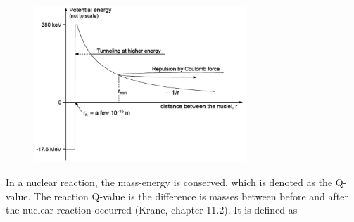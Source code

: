 \documentclass[a4paper,11pt,twoside]{book}
\begin{document}



\begin{figure}
    \centering
    \includegraphics[width=8cm]{Theory/Coulomb_barr.png}
    \caption{ }
    \label{fig:Coulomb_barrier}
\end{figure}

\noindent In a nuclear reaction, the mass-energy is conserved, which is denoted as the Q-value. The reaction Q-value is the difference is masses between before and after the nuclear reaction occurred (Krane, chapter 11.2). It is defined as 
\end{document}
